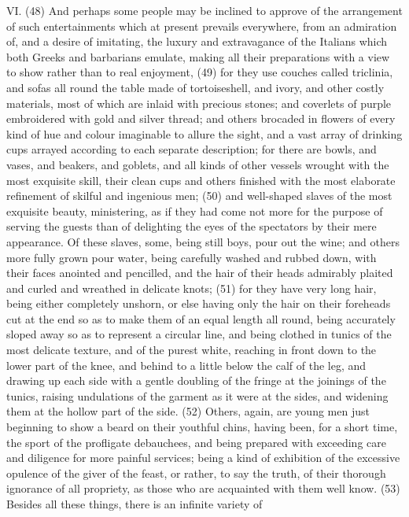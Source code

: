 VI. (48) And perhaps some people may be inclined to approve of the arrangement of such
entertainments which at present prevails everywhere, from an admiration of, and a desire of
imitating, the luxury and extravagance of the Italians which both Greeks and barbarians emulate,
making all their preparations with a view to show rather than to real enjoyment, (49) for they use
couches called triclinia, and sofas all round the table made of tortoiseshell, and ivory, and other
costly materials, most of which are inlaid with precious stones; and coverlets of purple
embroidered with gold and silver thread; and others brocaded in flowers of every kind of hue and
colour imaginable to allure the sight, and a vast array of drinking cups arrayed according to each
separate description; for there are bowls, and vases, and beakers, and goblets, and all kinds of
other vessels wrought with the most exquisite skill, their clean cups and others finished with the
most elaborate refinement of skilful and ingenious men; (50) and well-shaped slaves of the most
exquisite beauty, ministering, as if they had come not more for the purpose of serving the guests
than of delighting the eyes of the spectators by their mere appearance. Of these slaves, some,
being still boys, pour out the wine; and others more fully grown pour water, being carefully washed
and rubbed down, with their faces anointed and pencilled, and the hair of their heads admirably
plaited and curled and wreathed in delicate knots; (51) for they have very long hair, being either
completely unshorn, or else having only the hair on their foreheads cut at the end so as to make
them of an equal length all round, being accurately sloped away so as to represent a circular line,
and being clothed in tunics of the most delicate texture, and of the purest white, reaching in front
down to the lower part of the knee, and behind to a little below the calf of the leg, and drawing up
each side with a gentle doubling of the fringe at the joinings of the tunics, raising undulations of the
garment as it were at the sides, and widening them at the hollow part of the side. (52) Others,
again, are young men just beginning to show a beard on their youthful chins, having been, for a
short time, the sport of the profligate debauchees, and being prepared with exceeding care and
diligence for more painful services; being a kind of exhibition of the excessive opulence of the
giver of the feast, or rather, to say the truth, of their thorough ignorance of all propriety, as those
who are acquainted with them well know. (53) Besides all these things, there is an infinite variety of

